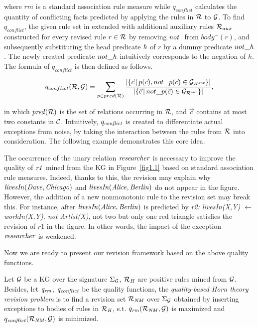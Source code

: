 where $rm$ is a standard association rule measure while $q_{conflict}$ calculates the quantity of conflicting facts predicted by applying the rules in $\mathcal{R}$ to $\mathcal{G}$. To find $q_{conflict}$, the given rule set in extended with additional auxiliary rules $\mathcal{R}_{aux}$ constructed for every revised rule $r \in \mathcal{R}$ by removing $\naf$ from $body^-(r)$, and subsequently substituting the head predicate $\mathit{h}$ of $r$ by a dummy predicate $\mathit{not\_h}$. The newly created predicate $\mathit{not\_h}$ intuitively corresponds to the negation of $h$. The formula of $q_{conflict}$ is then defined as follows.

\begin{equation}
q_{conflict}(\mathcal{R},\mathcal{G})=\sum_{p\in pred(\mathcal{R})} \dfrac{|\{ \vec{c}\,|\,p(\vec{c}),not\_p(\vec{c})\in \mathcal{G}_{\mathcal{R}^{\mathit{aux}}}\} |}{|\{ \vec{c}\,|\,not\_p(\vec{c})\in \mathcal{G}_{\mathcal{R}^{\mathit{aux}}}\} |}
\label{eq:conflict},
\end{equation}

in which $\mathit{pred(\mathcal{R})}$ is the set of relations occurring in $\mathcal{R}$, and $\vec{c}$ contains at most two constants in $\mathcal{C}$. Intuitively, $q_{\mathit{conflict}}$ is created to differentiate actual exceptions from noise, by taking the interaction between the rules from $\mathcal{R}$ into consideration. The following example demonstrates this core idea.

\begin{example}

The occurrence of the unary relation $\mathit{researcher}$ is necessary to improve the quality of $\mathit{r1}$ mined from the KG in Figure~\ref{fig1.1} based on standard association rule measures. Indeed, thanks to this, the revision may explain why $\mathit{livesIn(Dave,Chicago)}$ and $\mathit{livesIn(Alice,Berlin)}$ do not appear in the figure. However, the addition of a new nonmonotonic rule to the revision set may break this. For instance, after $\mathit{livesIn(Alice,Berlin)}$ is predicted by \textit{r2: livesIn(X,Y) $\leftarrow$ workIn(X,Y), not Artist(X)}, not two but only one red triangle satisfies the revision of $r1$ in the figure. In other words, the impact of the exception $\mathit{researcher}$ is weakened.
\end{example}

Now we are ready to present our revision framework based on the above quality functions.

\begin{definition} \label{def:qhtr}
Let $\mathcal{G}$ be a KG over the signature $\Sigma_{\mathcal{G}}$, $\mathcal{R}_{\mathit{H}}$ are positive rules mined from $\mathcal{G}$. Besides, let $\mathit{q_{rm}}$, $\mathit{q_{conflict}}$ be the quality functions, the \emph{quality-based Horn theory revision problem} is to find a revision set $\mathcal{R}_{\mathit{NM}}$ over $\Sigma_{\mathcal{G}}$ obtained by inserting exceptions to bodies of rules in $\mathcal{R}_{\mathit{H}}$, s.t. $q_{\mathit{rm}}(\mathcal{R}_{\mathit{NM}},\mathcal{G})$ is maximized and $q_{\mathit{conflict}}(\mathcal{R}_{\mathit{NM}},\mathcal{G})$ is minimized.
\end{definition}

